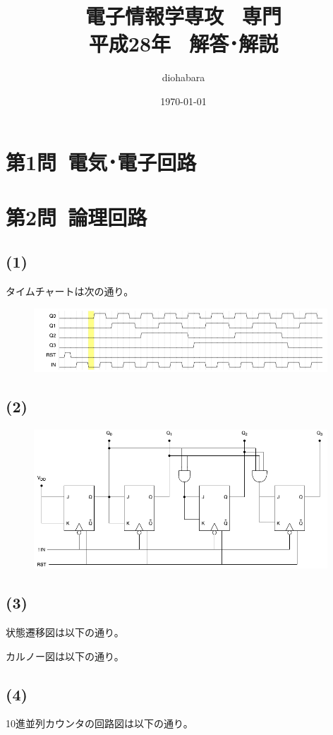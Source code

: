 \documentclass[a4paper,12pt,xelatex,ja=standard]{bxjsarticle}
\title{電子情報学専攻 \, 専門 \\ 平成28年 \, 解答･解説}
\author{diohabara}
\date{\today}
\begin{document}
\maketitle

\section*{第1問\ 電気･電子回路}

\section*{第2問\ 論理回路}
\subsection*{(1)}
タイムチャートは次の通り。
\begin{figure}[H]
  \centering
  \includegraphics[width=11cm]{images/2017_timechart.png}
\end{figure}

\subsection*{(2)}
\begin{figure}[H]
  \centering
  \includegraphics[width=11cm]{images/2017_synchronous_counter.png}
\end{figure}

\subsection*{(3)}
状態遷移図は以下の通り。

カルノー図は以下の通り。

\subsection*{(4)}
10進並列カウンタの回路図は以下の通り。
\end{document}
